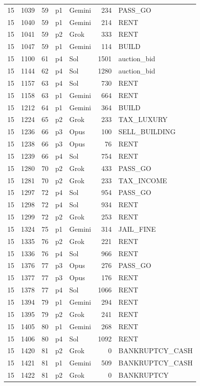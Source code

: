 \begin{longtable}{r r r l l r L{2.2in}}
15 & 1039 & 59 & p1 & Gemini & 234 & PASS\_GO \\
15 & 1040 & 59 & p1 & Gemini & 214 & RENT \\
15 & 1041 & 59 & p2 & Grok & 333 & RENT \\
15 & 1047 & 59 & p1 & Gemini & 114 & BUILD \\
15 & 1100 & 61 & p4 & Sol & 1501 & auction\_bid \\
15 & 1144 & 62 & p4 & Sol & 1280 & auction\_bid \\
15 & 1157 & 63 & p4 & Sol & 730 & RENT \\
15 & 1158 & 63 & p1 & Gemini & 664 & RENT \\
15 & 1212 & 64 & p1 & Gemini & 364 & BUILD \\
15 & 1224 & 65 & p2 & Grok & 233 & TAX\_LUXURY \\
15 & 1236 & 66 & p3 & Opus & 100 & SELL\_BUILDING \\
15 & 1238 & 66 & p3 & Opus & 76 & RENT \\
15 & 1239 & 66 & p4 & Sol & 754 & RENT \\
15 & 1280 & 70 & p2 & Grok & 433 & PASS\_GO \\
15 & 1281 & 70 & p2 & Grok & 233 & TAX\_INCOME \\
15 & 1297 & 72 & p4 & Sol & 954 & PASS\_GO \\
15 & 1298 & 72 & p4 & Sol & 934 & RENT \\
15 & 1299 & 72 & p2 & Grok & 253 & RENT \\
15 & 1324 & 75 & p1 & Gemini & 314 & JAIL\_FINE \\
15 & 1335 & 76 & p2 & Grok & 221 & RENT \\
15 & 1336 & 76 & p4 & Sol & 966 & RENT \\
15 & 1376 & 77 & p3 & Opus & 276 & PASS\_GO \\
15 & 1377 & 77 & p3 & Opus & 176 & RENT \\
15 & 1378 & 77 & p4 & Sol & 1066 & RENT \\
15 & 1394 & 79 & p1 & Gemini & 294 & RENT \\
15 & 1395 & 79 & p2 & Grok & 241 & RENT \\
15 & 1405 & 80 & p1 & Gemini & 268 & RENT \\
15 & 1406 & 80 & p4 & Sol & 1092 & RENT \\
15 & 1420 & 81 & p2 & Grok & 0 & BANKRUPTCY\_CASH \\
15 & 1421 & 81 & p1 & Gemini & 509 & BANKRUPTCY\_CASH \\
15 & 1422 & 81 & p2 & Grok & 0 & BANKRUPTCY \\

\end{longtable}
